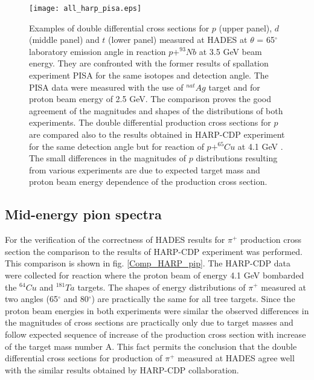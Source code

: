 \begin{figure}
	\texttt{[image: all\_harp\_pisa.eps]}
	\caption{\label{Comp_PISA_HARP_pdt} 
		Examples of double differential cross sections for $p$ (upper panel), $d$ (middle panel) and $t$ 
		(lower panel) measured at HADES 
		at $\theta$ = 65$^{\circ}$ laboratory emission angle in reaction $p+^{93}Nb$ at 
		3.5 GeV beam energy.  They are confronted with the former results of spallation  
		experiment PISA \cite{fidelus2017non} for the same isotopes and detection angle. 
		The PISA data were measured with the use of $^{nat}Ag$ target and 
		for proton beam energy of 2.5 GeV. The comparison proves the good agreement of the magnitudes 
		and shapes of the distributions of both experiments. The double differential production 
		cross sections for $p$ are compared also to the results obtained in HARP-CDP experiment 
		for the same detection angle but for reaction of  
		$p+^{65}Cu$ at 4.1 GeV \cite{HARP_CDP_Cu_2009}. The small differences in the magnitudes 
		of $p$ distributions  resulting from various experiments are due to expected 
		target mass and proton beam energy dependence of the production cross section. 
	}
\end{figure}
\subsection{\label{pion_data} Mid-energy pion spectra}

For the verification of the correctness of HADES results for $\pi^{+}$ production 
cross section the comparison to the results of 
HARP-CDP experiment was performed. This comparison is shown in fig. \ref{Comp_HARP_pip}. 
The HARP-CDP data were collected for reaction where the proton beam of energy 4.1 GeV 
bombarded the $^{64}Cu$ \cite{HARP_CDP_Cu_2009} and $^{181}Ta$ \cite{HARP_CDP_Ta_2009} targets. 
The shapes of energy distributions of $\pi^{+}$ measured at two angles (65$^{\circ}$ and 80$^{\circ}$) 
are practically the same for all tree targets.
Since the proton beam energies in both experiments were similar the observed differences 
in the magnitudes of cross sections are practically only due to target masses and 
follow expected sequence of increase of the production cross section with increase 
of the target mass number A. This fact permits the conclusion that 
the double differential cross sections for production of $\pi^{+}$ measured at HADES agree 
well with the similar results obtained by HARP-CDP collaboration.


